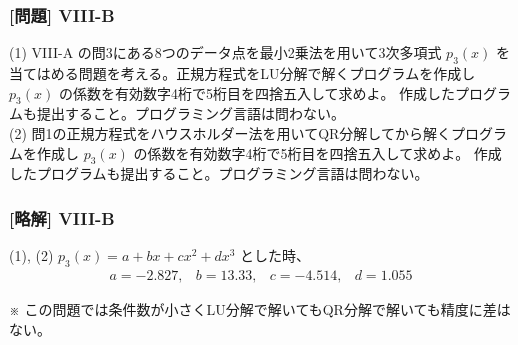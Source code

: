 \documentclass[dvipdfmx,aspectratio=169,20pt]{beamer}
\newcommand{\myfontsetting}[3]{{\fontsize{#1}{#2}\selectfont #3}}
\begin{document}
\begin{frame}
\frametitle{[問題] V\hspace{-.1em}I\hspace{-.1em}I\hspace{-.1em}I-B}
\myfontsetting{15pt}{20pt}{
(1) {V\hspace{-.1em}I\hspace{-.1em}I\hspace{-.1em}I-A} の問3にある8つのデータ点を最小2乗法を用いて3次多項式 $p_3(x)$ を当てはめる問題を考える。正規方程式をLU分解で解くプログラムを作成し $p_3(x)$ の係数を有効数字4桁で5桁目を四捨五入して求めよ。
作成したプログラムも提出すること。プログラミング言語は問わない。\\
(2) 問1の正規方程式をハウスホルダー法を用いてQR分解してから解くプログラムを作成し $p_3(x)$ の係数を有効数字4桁で5桁目を四捨五入して求めよ。
作成したプログラムも提出すること。プログラミング言語は問わない。
}
\end{frame}
\begin{frame}
\frametitle{[略解] V\hspace{-.1em}I\hspace{-.1em}I\hspace{-.1em}I-B}
\myfontsetting{18pt}{18pt}{
(1), (2)
$p_3(x)=a + b x + c x^2 + dx^3$ とした時、
\[
\begin{matrix}
a = -2.827, & b =  13.33, &c = -4.514, & d = 1.055
\end{matrix}
\]
}

\vspace{10mm}

\myfontsetting{10pt}{10pt}{
※ この問題では条件数が小さくLU分解で解いてもQR分解で解いても精度に差はない。
}
\end{frame}
\end{document}
